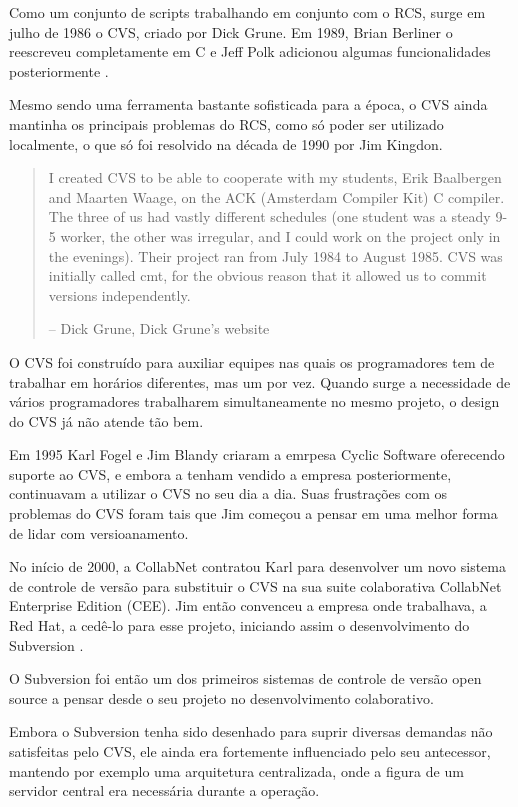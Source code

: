 Como um conjunto de scripts trabalhando em conjunto com o RCS, surge em
julho de 1986 o CVS, criado por Dick Grune. Em 1989, Brian Berliner o
reescreveu completamente em C e Jeff Polk adicionou algumas
funcionalidades posteriormente \cite{Bar}.

Mesmo sendo uma ferramenta bastante sofisticada para a época, o CVS ainda
mantinha os principais problemas do RCS, como só poder
ser utilizado localmente, o que só foi resolvido na década de 1990 por
Jim Kingdon.

\begin{quote}
I created CVS to be able to cooperate with my students, Erik Baalbergen and Maarten Waage, on the ACK (Amsterdam Compiler Kit) C compiler. The three of us had vastly different schedules (one student was a steady 9-5 worker, the other was irregular, and I could work on the project only in the evenings). Their project ran from July 1984 to August 1985. CVS was initially called cmt, for the obvious reason that it allowed us to commit versions independently.

– Dick Grune, Dick Grune's website
\end{quote}

O CVS foi construído para auxiliar equipes nas quais os programadores tem
de trabalhar em horários diferentes, mas um por vez. Quando surge a necessidade
de vários programadores trabalharem simultaneamente no mesmo projeto, o design
do CVS já não atende tão bem.

Em 1995 Karl Fogel e Jim Blandy criaram a emrpesa Cyclic Software oferecendo
suporte ao CVS, e embora a tenham vendido a empresa posteriormente, continuavam
a utilizar o CVS no seu dia a dia. Suas frustrações com os problemas do CVS
foram tais que Jim começou a pensar em uma melhor forma de lidar com
versioanamento.

No início de 2000, a CollabNet contratou Karl para desenvolver um novo
sistema de controle de versão para substituir o CVS na sua suite colaborativa
CollabNet Enterprise Edition (CEE). Jim então convenceu a empresa onde trabalhava,
a Red Hat, a cedê-lo para esse projeto, iniciando assim o desenvolvimento
do Subversion \cite{Sussman}.

O Subversion foi então um dos primeiros sistemas de controle de versão
open source a pensar desde o seu projeto no desenvolvimento colaborativo.

Embora o Subversion tenha sido desenhado para suprir diversas demandas
não satisfeitas pelo CVS, ele ainda era fortemente influenciado pelo seu
antecessor, mantendo por exemplo uma arquitetura centralizada, onde a
figura de um servidor central era necessária durante a operação.

